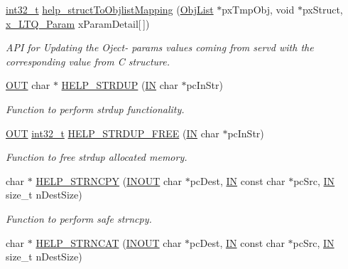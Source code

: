 \begin{DoxyCompactItemize}
\hyperlink{commondefs_8h_a32f2e37ee053cf2ce8ca28d1f74630e5}{int32\-\_\-t} \hyperlink{group__LIBHELP_gabde6cd1678f5635e93a21caa32652427}{help\-\_\-struct\-To\-Objlist\-Mapping} (\hyperlink{structObjList}{Obj\-List} $\ast$px\-Tmp\-Obj, void $\ast$px\-Struct, \hyperlink{structx__LTQ__Param}{x\-\_\-\-L\-T\-Q\-\_\-\-Param} x\-Param\-Detail\mbox{[}$\,$\mbox{]})
\begin{DoxyCompactList}\small\item\em A\-P\-I for Updating the Oject-\/ params values coming from servd with the corresponding value from C structure. \end{DoxyCompactList}\item 
\hyperlink{group__LIBHELP_gaec78e7a9e90a406a56f859ee456e8eae}{O\-U\-T} char $\ast$ \hyperlink{group__LIBHELP_gae446d514164f23d3e91f7170e9fc973b}{H\-E\-L\-P\-\_\-\-S\-T\-R\-D\-U\-P} (\hyperlink{group__LIBHELP_gac2bbd6d630a06a980d9a92ddb9a49928}{I\-N} char $\ast$pc\-In\-Str)
\begin{DoxyCompactList}\small\item\em Function to perform strdup functionality. \end{DoxyCompactList}\item 
\hyperlink{group__LIBHELP_gaec78e7a9e90a406a56f859ee456e8eae}{O\-U\-T} \hyperlink{commondefs_8h_a32f2e37ee053cf2ce8ca28d1f74630e5}{int32\-\_\-t} \hyperlink{group__LIBHELP_ga1ec415f0fca441424045a6af058be412}{H\-E\-L\-P\-\_\-\-S\-T\-R\-D\-U\-P\-\_\-\-F\-R\-E\-E} (\hyperlink{group__LIBHELP_gac2bbd6d630a06a980d9a92ddb9a49928}{I\-N} char $\ast$pc\-In\-Str)
\begin{DoxyCompactList}\small\item\em Function to free strdup allocated memory. \end{DoxyCompactList}\item 
char $\ast$ \hyperlink{group__LIBHELP_gaa326c5a055a6ea61eba5c165005fc5b6}{H\-E\-L\-P\-\_\-\-S\-T\-R\-N\-C\-P\-Y} (\hyperlink{group__LIBHELP_ga62766f3ea8784d1db62df989f8f33d2d}{I\-N\-O\-U\-T} char $\ast$pc\-Dest, \hyperlink{group__LIBHELP_gac2bbd6d630a06a980d9a92ddb9a49928}{I\-N} const char $\ast$pc\-Src, \hyperlink{group__LIBHELP_gac2bbd6d630a06a980d9a92ddb9a49928}{I\-N} size\-\_\-t n\-Dest\-Size)
\begin{DoxyCompactList}\small\item\em Function to perform safe strncpy. \end{DoxyCompactList}\item 
char $\ast$ \hyperlink{group__LIBHELP_gaa84cc97acac4c77866e70fc850a1c670}{H\-E\-L\-P\-\_\-\-S\-T\-R\-N\-C\-A\-T} (\hyperlink{group__LIBHELP_ga62766f3ea8784d1db62df989f8f33d2d}{I\-N\-O\-U\-T} char $\ast$pc\-Dest, \hyperlink{group__LIBHELP_gac2bbd6d630a06a980d9a92ddb9a49928}{I\-N} const char $\ast$pc\-Src, \hyperlink{group__LIBHELP_gac2bbd6d630a06a980d9a92ddb9a49928}{I\-N} size\-\_\-t n\-Dest\-Size)

\end{DoxyCompactItemize}
